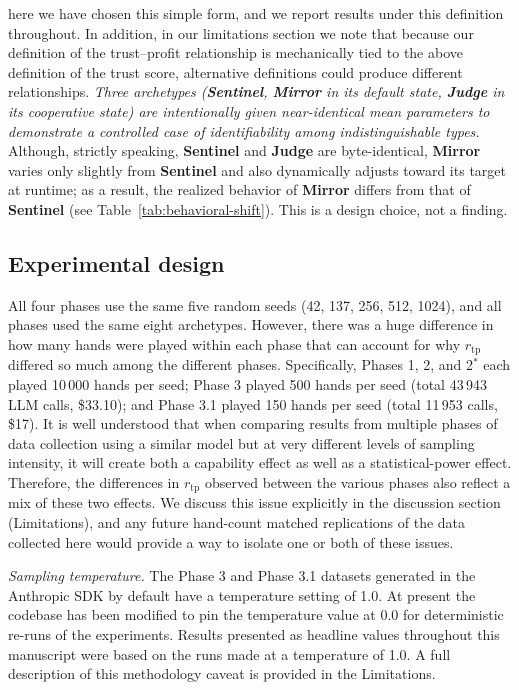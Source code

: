 \documentclass[10pt]{article} %
\newcommand{\arch}[1]{\textbf{#1}}
\newcommand{\rtp}{\ensuremath{r_{\mathrm{tp}}}}
\begin{document}
here we have chosen this simple form, and we report results under
this definition throughout. In addition, in our
limitations section we note that because our definition of the
trust--profit relationship is mechanically tied to the above
definition of the trust score, alternative definitions could
produce different relationships. \textit{Three archetypes
(\arch{Sentinel}, \arch{Mirror} in its default state, \arch{Judge}
in its cooperative state) are intentionally given near-identical mean
parameters to demonstrate a controlled case of identifiability among
indistinguishable types.} Although, strictly speaking,
\arch{Sentinel} and \arch{Judge} are byte-identical, \arch{Mirror}
varies only slightly from \arch{Sentinel} and also dynamically
adjusts toward its target at runtime; as a result, the realized
behavior of \arch{Mirror} differs from that of \arch{Sentinel}
(see Table~\ref{tab:behavioral-shift}).
This is a design choice, not a finding.

\subsection{Experimental design}
All four phases use the same five random seeds (42, 137, 256, 512,
1024), and all phases used the same eight archetypes. However, there
was a huge difference in how many hands were played within each
phase that can account for why $\rtp$ differed so much among the
different phases. Specifically, Phases 1, 2, and 2$^{*}$ each played
10\,000 hands per seed; Phase 3 played 500 hands per seed (total
43\,943 LLM calls, \$33.10); and Phase 3.1 played 150 hands per seed
(total 11\,953 calls, \$17). It is well understood that when
comparing results from multiple phases of data collection using a
similar model but at very different levels of sampling intensity, it
will create both a capability effect as well as a statistical-power
effect. Therefore, the differences in $\rtp$ observed between the
various phases also reflect a mix of these two effects. We discuss
this issue explicitly in the discussion section (Limitations), and
any future hand-count matched replications of the data collected
here would provide a way to isolate one or both of these issues.

\textit{Sampling temperature.} The Phase 3 and Phase 3.1 datasets
generated in the Anthropic SDK by default have a temperature setting
of 1.0. At present the codebase has been modified to pin the
temperature value at 0.0 for deterministic re-runs of the
experiments. Results presented as headline values throughout this
manuscript were based on the runs made at a temperature of 1.0. A
full description of this methodology caveat is provided in the
Limitations.
\end{document}
